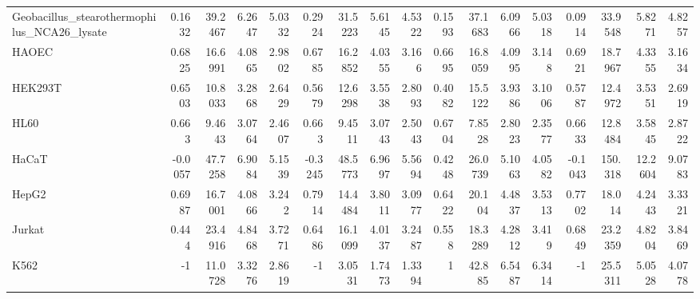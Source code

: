 \begin{tabular}{lrrrrrrrrrrrrrrrr}
 Geobacillus\_stearothermophilus\_NCA26\_lysate &              0.1632   &          39.2467 &           6.2647  &          5.0332  &         0.2924   &     31.5223 &       5.6145 &     4.5322  &       0.1593   &   37.1683 &    6.0966  &   5.0318  &         0.0914   &     33.9548 &      5.8271  &     4.8257  \\
 HAOEC                                       &              0.6825   &          16.6991 &           4.0865  &          2.9802  &         0.6785   &     16.2852 &       4.0355 &     3.166   &       0.6695   &   16.8059 &    4.0995  &   3.148   &         0.6921   &     18.7967 &      4.3355  &     3.1634  \\
 HEK293T                                     &              0.6503   &          10.8033 &           3.2868  &          2.6429  &         0.5679   &     12.6298 &       3.5538 &     2.8093  &       0.4082   &   15.5122 &    3.9386  &   3.1006  &         0.5787   &     12.4972 &      3.5351  &     2.6919  \\
 HL60                                        &              0.663    &           9.4643 &           3.0764  &          2.4607  &         0.663    &      9.4511 &       3.0743 &     2.5043  &       0.6704   &    7.8528 &    2.8023  &   2.3577  &         0.6633   &     12.8484 &      3.5845  &     2.8722  \\
 HaCaT                                       &             -0.0057   &          47.7258 &           6.9084  &          5.1539  &        -0.3245   &     48.5773 &       6.9697 &     5.5694  &       0.4248   &   26.0739 &    5.1063  &   4.0582  &        -0.1043   &    150.318  &     12.2604  &     9.0783  \\
 HepG2                                       &              0.6987   &          16.7001 &           4.0866  &          3.242   &         0.7914   &     14.4484 &       3.8011 &     3.0977  &       0.6422   &   20.104  &    4.4837  &   3.5313  &         0.7702   &     18.014  &      4.2443  &     3.3321  \\
 Jurkat                                      &              0.444    &          23.4916 &           4.8468  &          3.7271  &         0.6486   &     16.1099 &       4.0137 &     3.2487  &       0.558    &   18.3289 &    4.2812  &   3.419   &         0.6849   &     23.2359 &      4.8204  &     3.8469  \\
 K562                                        &             -1        &          11.0728 &           3.3276  &          2.8619  &        -1        &      3.0531 &       1.7473 &     1.3394  &       1        &   42.885  &    6.5487  &   6.3414  &        -1        &     25.5311 &      5.0528  &     4.0778  \\

\end{tabular}

